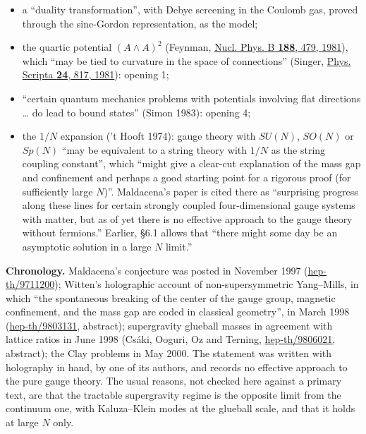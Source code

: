 \documentclass[11pt,a4paper]{article}
\newcommand{\tightlist}{\setlength{\itemsep}{0pt}\setlength{\parskip}{0pt}}
\begin{document}
\begin{itemize}
\tightlist
\item
  a ``duality transformation'', with Debye screening in the Coulomb gas,
  proved through the sine-Gordon representation, as the model;
\item
  the quartic potential \((A\wedge A)^2\) (Feynman,
  \href{https://doi.org/10.1016/0550-3213(81)90005-5}{Nucl. Phys. B
  \textbf{188}, 479, 1981}), which ``may be tied to curvature in the
  space of connections'' (Singer,
  \href{https://doi.org/10.1088/0031-8949/24/5/002}{Phys. Scripta
  \textbf{24}, 817, 1981}): opening 1;
\item
  ``certain quantum mechanics problems with potentials involving flat
  directions \ldots{} do lead to bound states'' (Simon 1983): opening 4;
\item
  the \(1/N\) expansion ('t Hooft 1974): gauge theory with \(SU(N)\),
  \(SO(N)\) or \(Sp(N)\) ``may be equivalent to a string theory with
  \(1/N\) as the string coupling constant'', which ``might give a
  clear-cut explanation of the mass gap and confinement and perhaps a
  good starting point for a rigorous proof (for sufficiently large
  \(N\))''. Maldacena's paper is cited there as ``surprising progress
  along these lines for certain strongly coupled four-dimensional gauge
  systems with matter, but as of yet there is no effective approach to
  the gauge theory without fermions.'' Earlier, §6.1 allows that ``there
  might some day be an asymptotic solution in a large \(N\) limit.''
\end{itemize}

\textbf{Chronology.} Maldacena's conjecture was posted in November 1997
(\href{https://arxiv.org/abs/hep-th/9711200}{hep-th/9711200}); Witten's
holographic account of non-supersymmetric Yang--Mills, in which ``the
spontaneous breaking of the center of the gauge group, magnetic
confinement, and the mass gap are coded in classical geometry'', in
March 1998 (\href{https://arxiv.org/abs/hep-th/9803131}{hep-th/9803131},
abstract); supergravity glueball masses in agreement with lattice ratios
in June 1998 (Csáki, Ooguri, Oz and Terning,
\href{https://arxiv.org/abs/hep-th/9806021}{hep-th/9806021}, abstract);
the Clay problems in May 2000. The statement was written with holography
in hand, by one of its authors, and records no effective approach to the
pure gauge theory. The usual reasons, not checked here against a primary
text, are that the tractable supergravity regime is the opposite limit
from the continuum one, with Kaluza--Klein modes at the glueball scale,
and that it holds at large \(N\) only.
\end{document}

